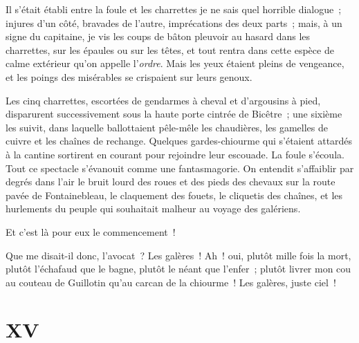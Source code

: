 \documentclass[french,twoside]{book} %
\begin{document}
Il s’était établi entre la foule et les charrettes je ne sais quel horrible dialogue ; injures d’un côté, bravades de l’autre, imprécations des deux parts ; mais, à un signe du capitaine, je vis les coups de bâton pleuvoir au hasard dans les charrettes, sur les épaules ou sur les têtes, et tout rentra dans cette espèce de calme extérieur qu’on appelle l’\emph{ordre}. Mais les yeux étaient pleins de vengeance, et les poings des misérables se crispaient sur leurs genoux.\par
Les cinq charrettes, escortées de gendarmes à cheval et d’argousins à pied, disparurent successivement sous la haute porte cintrée de Bicêtre ; une sixième les suivit, dans laquelle ballottaient pêle-mêle les chaudières, les gamelles de cuivre et les chaînes de rechange. Quelques gardes-chiourme qui s’étaient attardés à la cantine sortirent en courant pour rejoindre leur escouade. La foule s’écoula. Tout ce spectacle s’évanouit comme une fantasmagorie. On entendit s’affaiblir par degrés dans l’air le bruit lourd des roues et des pieds des chevaux sur la route pavée de Fontainebleau, le claquement des fouets, le cliquetis des chaînes, et les hurlements du peuple qui souhaitait malheur au voyage des galériens.\par
 Et c’est là pour eux le commencement !\par
Que me disait-il donc, l’avocat ? Les galères ! Ah ! oui, plutôt mille fois la mort, plutôt l’échafaud que le bagne, plutôt le néant que l’enfer ; plutôt livrer mon cou au couteau de Guillotin qu’au carcan de la chiourme ! Les galères, juste ciel !
 \section[{XV}]{XV}
\label{ch15}\renewcommand{\leftmark}{XV}
\end{document}
